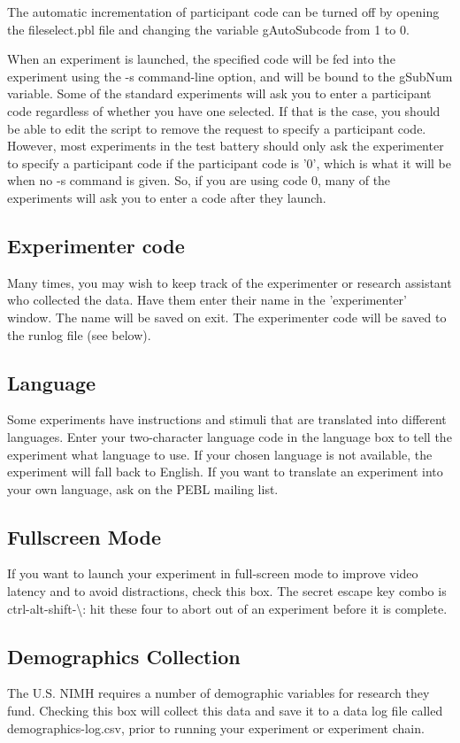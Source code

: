 The automatic incrementation of participant code can be turned off by
opening the fileselect.pbl file and changing the variable gAutoSubcode
from 1 to 0.

When an experiment is launched, the specified code will be fed into
the experiment using the -s command-line option, and will be bound to
the gSubNum variable.  Some of the standard experiments will ask you
to enter a participant code regardless of whether you have one selected.
If that is the case, you should be able to edit the script to remove
the request to specify a participant code. However, most experiments in
the test battery should only ask the experimenter to specify a participant
code if the participant code is '0', which is what it will be when no -s
command is given.  So, if you are using code 0, many of the
experiments will ask you to enter a code after they launch.


\subsection{Experimenter code}
Many times, you may wish to keep track of the experimenter or research
assistant who collected the data.  Have them enter their name in the
'experimenter' window.  The name will be saved on exit.  The
experimenter code will be saved to the runlog file (see below). 

\subsection{Language}
Some experiments have instructions and stimuli that are translated
into different languages.  Enter your two-character language code in
the language box to tell the experiment what language to use. If your
chosen language is not available, the experiment will fall back to
English.  If you want to translate an experiment into your own
language, ask on the PEBL mailing list.

\subsection{Fullscreen Mode}
If you want to launch your experiment in full-screen mode to improve
video latency and to avoid distractions, check this box. The secret
escape key combo is ctrl-alt-shift-\textbackslash : hit these four to abort out of
an experiment before it is complete.

\subsection{Demographics Collection}
The U.S. NIMH requires a number of demographic variables for research
they fund. Checking this box will collect this data and save it to a
data log file called demographics-log.csv, prior to running your experiment or experiment chain.

